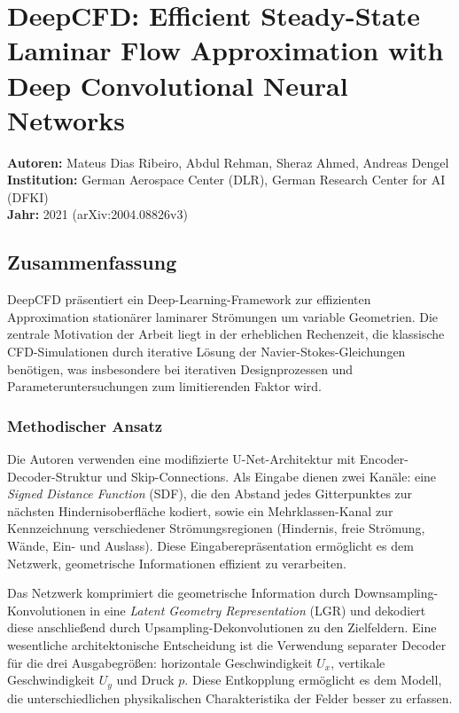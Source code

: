 \documentclass[a4paper,12pt]{article}
\begin{document}
\section*{DeepCFD: Efficient Steady-State Laminar Flow Approximation with Deep Convolutional Neural Networks}

\textbf{Autoren:} Mateus Dias Ribeiro, Abdul Rehman, Sheraz Ahmed, Andreas Dengel \\
\textbf{Institution:} German Aerospace Center (DLR), German Research Center for AI (DFKI) \\
\textbf{Jahr:} 2021 (arXiv:2004.08826v3)

\subsection*{Zusammenfassung}

DeepCFD präsentiert ein Deep-Learning-Framework zur effizienten Approximation stationärer laminarer Strömungen um variable Geometrien. Die zentrale Motivation der Arbeit liegt in der erheblichen Rechenzeit, die klassische CFD-Simulationen durch iterative Lösung der Navier-Stokes-Gleichungen benötigen, was insbesondere bei iterativen Designprozessen und Parameteruntersuchungen zum limitierenden Faktor wird.

\subsubsection*{Methodischer Ansatz}

Die Autoren verwenden eine modifizierte U-Net-Architektur mit Encoder-Decoder-Struktur und Skip-Connections. Als Eingabe dienen zwei Kanäle: eine \textit{Signed Distance Function} (SDF), die den Abstand jedes Gitterpunktes zur nächsten Hindernisoberfläche kodiert, sowie ein Mehrklassen-Kanal zur Kennzeichnung verschiedener Strömungsregionen (Hindernis, freie Strömung, Wände, Ein- und Auslass). Diese Eingaberepräsentation ermöglicht es dem Netzwerk, geometrische Informationen effizient zu verarbeiten.

Das Netzwerk komprimiert die geometrische Information durch Downsampling-Konvolutionen in eine \textit{Latent Geometry Representation} (LGR) und dekodiert diese anschließend durch Upsampling-Dekonvolutionen zu den Zielfeldern. Eine wesentliche architektonische Entscheidung ist die Verwendung separater Decoder für die drei Ausgabegrößen: horizontale Geschwindigkeit $U_x$, vertikale Geschwindigkeit $U_y$ und Druck $p$. Diese Entkopplung ermöglicht es dem Modell, die unterschiedlichen physikalischen Charakteristika der Felder besser zu erfassen.
\end{document}
